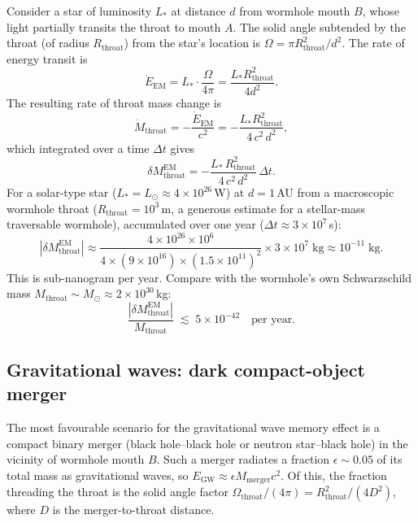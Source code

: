\documentclass[aps,prd,onecolumn,nofootinbib,superscriptaddress]{revtex4-2}
\begin{document}
Consider a star of luminosity $L_*$ at distance $d$ from wormhole mouth $B$,
whose light partially transits the throat to mouth $A$.  The solid angle
subtended by the throat (of radius $R_{\mathrm{throat}}$) from the star's
location is $\Omega = \pi R_{\mathrm{throat}}^2/d^2$.  The rate of energy
transit is
\begin{equation}
  \dot{E}_{\mathrm{EM}} = L_* \cdot \frac{\Omega}{4\pi}
  = \frac{L_* R_{\mathrm{throat}}^2}{4 d^2}.
\end{equation}
The resulting rate of throat mass change is
\begin{equation}
  \dot{M}_{\mathrm{throat}} = -\frac{\dot{E}_{\mathrm{EM}}}{c^2}
  = -\frac{L_* R_{\mathrm{throat}}^2}{4\, c^2\, d^2},
\end{equation}
which integrated over a time $\Delta t$ gives
\begin{equation}
  \delta M_{\mathrm{throat}}^{\mathrm{EM}}
  = -\frac{L_*\,R_{\mathrm{throat}}^2}{4\,c^2\,d^2}\,\Delta t.
\end{equation}
For a solar-type star ($L_*=L_\odot\approx 4\times 10^{26}$\,W) at
$d=1$\,AU from a macroscopic wormhole throat ($R_{\mathrm{throat}}=10^3$\,m,
a generous estimate for a stellar-mass traversable wormhole), accumulated over
one year ($\Delta t\approx 3\times 10^7$\,s):
\begin{equation}
  |\delta M_{\mathrm{throat}}^{\mathrm{EM}}|
  \approx
  \frac{4\times 10^{26}\times 10^6}{4\times (9\times 10^{16})\times (1.5\times 10^{11})^2}
  \times 3\times 10^7
  \;\mathrm{kg}
  \approx 10^{-11}\;\mathrm{kg}.
\end{equation}
This is sub-nanogram per year.  Compare with the wormhole's own
Schwarzschild mass $M_{\mathrm{throat}}\sim M_\odot\approx 2\times 10^{30}$\,kg:
\begin{equation}
  \frac{|\delta M_{\mathrm{throat}}^{\mathrm{EM}}|}{M_{\mathrm{throat}}}
  \;\lesssim\; 5\times 10^{-42}\quad\text{per year.}
\end{equation}

\subsection{Gravitational waves: dark compact-object merger}

The most favourable scenario for the gravitational wave memory effect is a
compact binary merger (black hole--black hole or neutron star--black hole) in
the vicinity of wormhole mouth $B$.  Such a merger radiates a fraction
$\epsilon\sim 0.05$ of its total mass as gravitational waves, so
$E_{\mathrm{GW}}\approx\epsilon M_{\mathrm{merger}}c^2$.  Of this, the
fraction threading the throat is the solid angle factor
$\Omega_{\mathrm{throat}}/(4\pi) = R_{\mathrm{throat}}^2/(4 D^2)$, where $D$
is the merger-to-throat distance.
\end{document}
